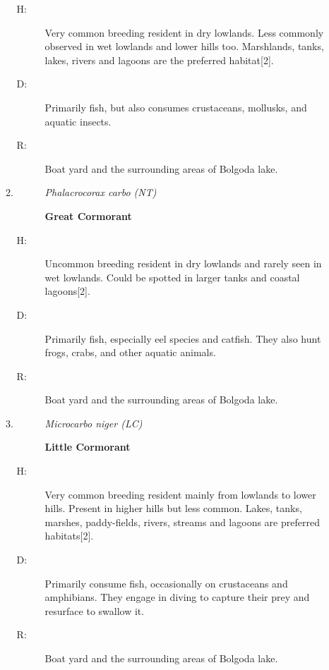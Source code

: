 \begin{itemize}
\begin{enumerate}
\begin{description}
\end{description}%
\begin{description}%
\item[H: ]%
Very common breeding resident in dry lowlands. Less commonly observed in wet lowlands and lower hills too. Marshlands, tanks, lakes, rivers and lagoons are the preferred habitat{[}2{]}.%
\item[D: ]%
Primarily fish, but also consumes crustaceans, mollusks, and aquatic insects.%
\item[R: ]%
Boat yard and the surrounding areas of Bolgoda lake.%
\end{description}%
\item%
\begin{description}%
\item[]%
\textit{Phalacrocorax carbo (NT)}%
\item[]%
\textbf{Great Cormorant}%
\end{description}%
\begin{description}%
\item[H: ]%
Uncommon breeding resident in dry lowlands and rarely seen in wet lowlands. Could be spotted in larger tanks and coastal lagoons{[}2{]}.%
\item[D: ]%
Primarily fish, especially eel species and catfish. They also hunt frogs, crabs, and other aquatic animals.%
\item[R: ]%
Boat yard and the surrounding areas of Bolgoda lake.%
\end{description}%
\item%
\begin{description}%
\item[]%
\textit{Microcarbo niger (LC)}%
\item[]%
\textbf{Little Cormorant}%
\end{description}%
\begin{description}%
\item[H: ]%
Very common breeding resident mainly from lowlands to lower hills. Present in higher hills but less common. Lakes, tanks, marshes, paddy-fields, rivers, streams and lagoons are preferred habitats{[}2{]}.%
\item[D: ]%
Primarily consume fish, occasionally on crustaceans and amphibians. They engage in diving to capture their prey and resurface to swallow it.%
\item[R: ]%
Boat yard and the surrounding areas of Bolgoda lake.%
\end{description}%
\end{enumerate}%

\end{itemize}
